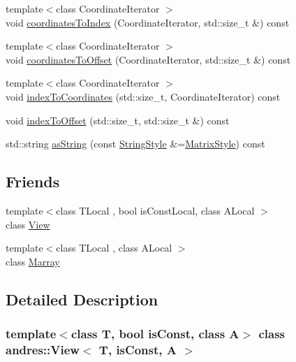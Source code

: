 \begin{DoxyCompactItemize}
{\footnotesize template$<$class Coordinate\+Iterator $>$ }\\void \hyperlink{classandres_1_1View_a49931615f15546e6794aefc0cd1b508e}{coordinates\+To\+Index} (Coordinate\+Iterator, std\+::size\+\_\+t \&) const
\item 
{\footnotesize template$<$class Coordinate\+Iterator $>$ }\\void \hyperlink{classandres_1_1View_aa5f0359e459abb7213522c9e21c5406b}{coordinates\+To\+Offset} (Coordinate\+Iterator, std\+::size\+\_\+t \&) const
\item 
{\footnotesize template$<$class Coordinate\+Iterator $>$ }\\void \hyperlink{classandres_1_1View_a4162a6266478800ff5f64998b3a703fb}{index\+To\+Coordinates} (std\+::size\+\_\+t, Coordinate\+Iterator) const
\item 
void \hyperlink{classandres_1_1View_af0e5f1df969af5aeba3175f1be77923d}{index\+To\+Offset} (std\+::size\+\_\+t, std\+::size\+\_\+t \&) const
\item 
std\+::string \hyperlink{classandres_1_1View_a6550f4ce912aa18d222f811a0ab44804}{as\+String} (const \hyperlink{namespaceandres_a69f07c437d156c7028c7d619e566281f}{String\+Style} \&=\hyperlink{namespaceandres_a69f07c437d156c7028c7d619e566281fa8b1efd8fc40539ba5b5255b46440eeaf}{Matrix\+Style}) const
\end{DoxyCompactItemize}
\subsection*{Friends}
\begin{DoxyCompactItemize}
\item 
{\footnotesize template$<$class T\+Local , bool is\+Const\+Local, class A\+Local $>$ }\\class \hyperlink{classandres_1_1View_a2658181be4befdf722462ab951ba8a67}{View}
\item 
{\footnotesize template$<$class T\+Local , class A\+Local $>$ }\\class \hyperlink{classandres_1_1View_aa5a68966149f255e52d7902758b0e002}{Marray}
\end{DoxyCompactItemize}


\subsection{Detailed Description}
\subsubsection*{template$<$class T, bool is\+Const, class A$>$\newline
class andres\+::\+View$<$ T, is\+Const, A $>$}

